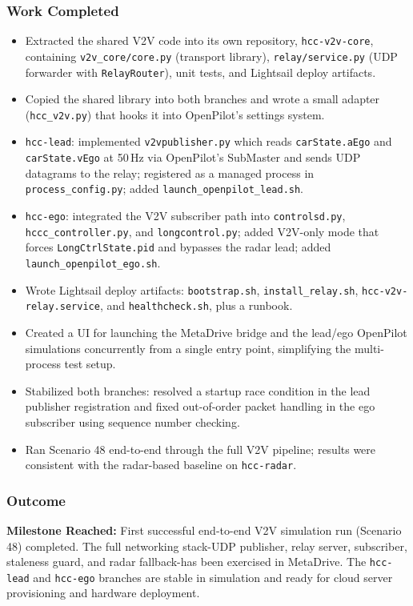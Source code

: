 \documentclass[12pt]{article}
\begin{document}
\subsubsection{Work Completed}
\begin{itemize}
  \item Extracted the shared V2V code into its own repository, \texttt{hcc-v2v-core}, containing \texttt{v2v\_core/core.py} (transport library), \texttt{relay/service.py} (UDP forwarder with \texttt{RelayRouter}), unit tests, and Lightsail deploy artifacts.
  \item Copied the shared library into both branches and wrote a small adapter (\texttt{hcc\_v2v.py}) that hooks it into OpenPilot's settings system.
  \item \texttt{hcc-lead}: implemented \texttt{v2vpublisher.py} which reads \texttt{carState.aEgo} and \texttt{carState.vEgo} at 50\,Hz via OpenPilot's SubMaster and sends UDP datagrams to the relay; registered as a managed process in \texttt{process\_config.py}; added \texttt{launch\_openpilot\_lead.sh}.
  \item \texttt{hcc-ego}: integrated the V2V subscriber path into \texttt{controlsd.py}, \texttt{hccc\_controller.py}, and \texttt{longcontrol.py}; added V2V-only mode that forces \texttt{LongCtrlState.pid} and bypasses the radar lead; added \texttt{launch\_openpilot\_ego.sh}.
  \item Wrote Lightsail deploy artifacts: \texttt{bootstrap.sh}, \texttt{install\_relay.sh}, \texttt{hcc-v2v-relay.service}, and \texttt{healthcheck.sh}, plus a runbook.
  \item Created a UI for launching the MetaDrive bridge and the lead/ego OpenPilot simulations concurrently from a single entry point, simplifying the multi-process test setup.
  \item Stabilized both branches: resolved a startup race condition in the lead publisher registration and fixed out-of-order packet handling in the ego subscriber using sequence number checking.
  \item Ran Scenario 48 end-to-end through the full V2V pipeline; results were consistent with the radar-based baseline on \texttt{hcc-radar}.
\end{itemize}

\subsubsection{Outcome}
\begin{notebox}
\textbf{Milestone Reached:} First successful end-to-end V2V simulation run (Scenario 48) completed. The full networking stack-UDP publisher, relay server, subscriber, staleness guard, and radar fallback-has been exercised in MetaDrive. The \texttt{hcc-lead} and \texttt{hcc-ego} branches are stable in simulation and ready for cloud server provisioning and hardware deployment.
\end{notebox}
\end{document}
